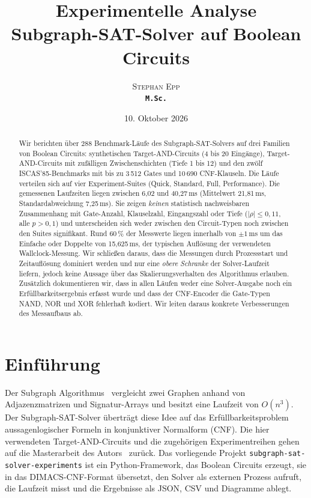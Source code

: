 \documentclass[a4paper,12pt]{article}
\title{Experimentelle Analyse\\Subgraph-SAT-Solver auf Boolean Circuits}
\author{\textsc{Stephan Epp}\\ {\small \texttt{\textbf{M.Sc.}}}}
\date{10. Oktober 2026}
\theoremstyle{definition}
\begin{document}
\maketitle

\begin{abstract}
\noindent
Wir berichten über 288 Benchmark-Läufe des Subgraph-SAT-Solvers auf drei Familien von Boolean Circuits: synthetischen Target-AND-Circuits (4 bis 20 Eingänge), Target-AND-Circuits mit zufälligen Zwischenschichten (Tiefe 1 bis 12) und den zwölf ISCAS'85-Benchmarks mit bis zu 3\,512 Gates und 10\,690 CNF-Klauseln. Die Läufe verteilen sich auf vier Experiment-Suites (Quick, Standard, Full, Performance). Die gemessenen Laufzeiten liegen zwischen 6,02 und 40,27\,ms (Mittelwert 21,81\,ms, Standardabweichung 7,25\,ms). Sie zeigen \emph{keinen} statistisch nachweisbaren Zusammenhang mit Gate-Anzahl, Klauselzahl, Eingangszahl oder Tiefe ($|\rho| \le 0{,}11$, alle $p > 0{,}1$) und unterscheiden sich weder zwischen den Circuit-Typen noch zwischen den Suites signifikant. Rund 60\,\% der Messwerte liegen innerhalb von $\pm 1$\,ms um das Einfache oder Doppelte von 15,625\,ms, der typischen Auflösung der verwendeten Wallclock-Messung. Wir schließen daraus, dass die Messungen durch Prozessstart und Zeitauflösung dominiert werden und nur eine \emph{obere Schranke} der Solver-Laufzeit liefern, jedoch keine Aussage über das Skalierungsverhalten des Algorithmus erlauben. Zusätzlich dokumentieren wir, dass in allen Läufen weder eine Solver-Ausgabe noch ein Erfüllbarkeitsergebnis erfasst wurde und dass der CNF-Encoder die Gate-Typen NAND, NOR und XOR fehlerhaft kodiert. Wir leiten daraus konkrete Verbesserungen des Messaufbaus ab.
\end{abstract}

\tableofcontents
\newpage

\section{Einführung}

Der Subgraph Algorithmus~\cite{epp-subgraph} vergleicht zwei Graphen anhand von Adjazenzmatrizen und Signatur-Arrays und besitzt eine Laufzeit von $O(n^3)$. Der Subgraph-SAT-Solver überträgt diese Idee auf das Erfüllbarkeitsproblem aussagenlogischer Formeln in konjunktiver Normalform (CNF). Die hier verwendeten Target-AND-Circuits und die zugehörigen Experimentreihen gehen auf die Masterarbeit des Autors~\cite{epp2013} zurück. Das vorliegende Projekt \texttt{subgraph-sat-solver-experiments} ist ein Python-Framework, das Boolean Circuits erzeugt, sie in das DIMACS-CNF-Format übersetzt, den Solver als externen Prozess aufruft, die Laufzeit misst und die Ergebnisse als JSON, CSV und Diagramme ablegt.
\end{document}
